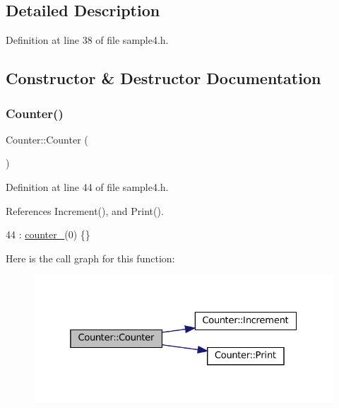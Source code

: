 \subsection{Detailed Description}


Definition at line 38 of file sample4.\+h.



\subsection{Constructor \& Destructor Documentation}
\mbox{\label{classCounter_a1e05f69b5240fbab3e7ab351672167f0}} 
\subsubsection{\texorpdfstring{Counter()}{Counter()}}
{\footnotesize\ttfamily Counter\+::\+Counter (\begin{DoxyParamCaption}{ }\end{DoxyParamCaption})\hspace{0.3cm}{\ttfamily [inline]}}



Definition at line 44 of file sample4.\+h.



References Increment(), and Print().


\begin{DoxyCode}
44 : \hyperlink{classCounter_abdef0bf73f0a68177863c42c6eba2fc0}{counter\_}(0) \{\}
\end{DoxyCode}
Here is the call graph for this function\+:
\nopagebreak
\begin{figure}[H]
\begin{center}
\leavevmode
\includegraphics[width=325pt]{classCounter_a1e05f69b5240fbab3e7ab351672167f0_cgraph}
\end{center}
\end{figure}


